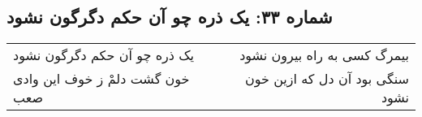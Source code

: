 \begin{center}
\section*{شماره ۳۳: یک ذره چو آن حکم دگرگون نشود}
\label{sec:033}
\begin{longtable}{l p{0.5cm} r}
یک ذره چو آن حکم دگرگون نشود
&&
بیمرگ کسی به راه بیرون نشود
\\
خون گشت دلمْ ز خوف این وادی صعب
&&
سنگی بود آن دل که ازین خون نشود
\\
\end{longtable}
\end{center}
